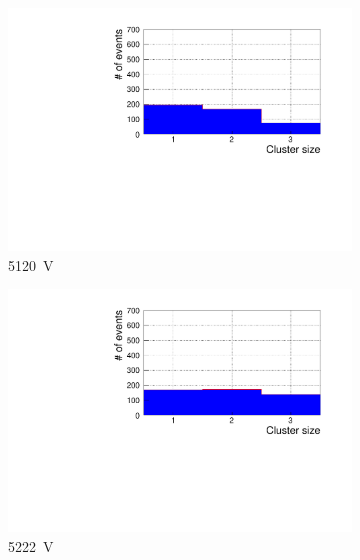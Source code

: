 \newpage
	
	\begin{figure}[H]
		\begin{subfigure}{.33\linewidth}
		    \centering
			\includegraphics[width=1.1\linewidth]{fig/chapt6/Muon-ClS-1D-5000-gRPC-INFN.pdf}
			\caption{\label{fig:cluster-size-1D:A} \SI{5120}{V}}
		\end{subfigure}
		\begin{subfigure}{.33\linewidth}
		    \centering
			\includegraphics[width=1.1\linewidth]{fig/chapt6/Muon-ClS-1D-5100-gRPC-INFN.pdf}
			\caption{\label{fig:cluster-size-1D:B} \SI{5222}{V}}
		\end{subfigure}
		\begin{subfigure}{.33\linewidth}
		    \centering

\end{subfigure}
\end{figure}
